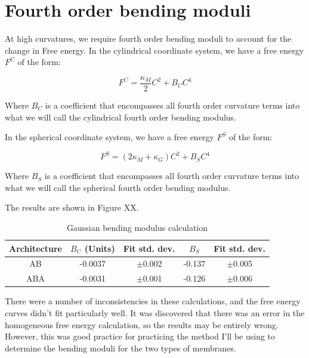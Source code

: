 \documentclass[11pt]{article} %
\begin{document}
\section{Fourth order bending moduli}

At high curvatures, we require fourth order bending moduli to account for the change in Free energy. In the cylindrical coordinate system, we have a free energy $F^C$ of the form:

\begin{equation}
F^C = \frac{\kappa_M}{2} C^2 + B_C C^4
\end{equation}

Where $B_C$ is a coefficient that encompasses all fourth order curvature terms into what we will call the cylindrical fourth order bending modulus.

In the spherical coordinate system, we have a free energy $F^S$ of the form:

\begin{equation}
F^S = (2 \kappa_M + \kappa_G)C^2 + B_S C^4
\end{equation}

Where $B_S$ is a coefficient that encompasses all fourth order curvature terms into what we will call the spherical fourth order bending modulus.

The results are shown in Figure XX.

\begin{table}[H]
\centering
\begin{center}
\begin{tabular}[c]{| c | c | c | c | c |}
\hline
Architecture &$B_C$ (Units) &Fit std. dev. &$B_S$ &Fit std. dev. \\
\hline
AB 	&-0.0037 & $\pm$0.002 &-0.137 &$\pm$0.005\\
ABA	&-0.0031 & $\pm$0.001 &-0.126 &$\pm$0.006\\
\hline
\end{tabular}
\end{center}
\caption{\small{Gaussian bending modulus calculation}}
\end{table}

There were a number of inconsistencies in these calculations, and the free energy curves didn't fit particularly well. It was discovered that there was an error in the homogeneous free energy calculation, so the results may be entirely wrong. However, this was good practice for practicing the method I'll be using to determine the bending moduli for the two types of membranes.
\end{document}
